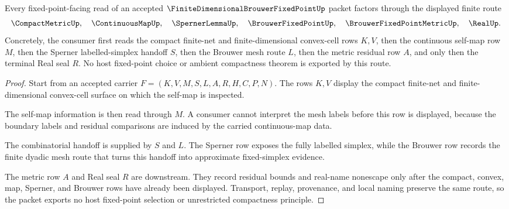 \begin{theorem}
\label{thm:finite-dimensional-brouwer-fixed-point-sperner-mesh-route}
Every fixed-point-facing read of an accepted $\FiniteDimensionalBrouwerFixedPointUp$ packet factors through the displayed finite route
$$
\CompactMetricUp,\quad \ContinuousMapUp,\quad \SpernerLemmaUp,\quad \BrouwerFixedPointUp,\quad \BrouwerFixedPointMetricUp,\quad \RealUp .
$$
Concretely, the consumer first reads the compact finite-net and finite-dimensional convex-cell rows $K,V$, then the continuous self-map row $M$, then the Sperner labelled-simplex handoff $S$, then the Brouwer mesh route $L$, then the metric residual row $A$, and only then the terminal Real seal $R$. No host fixed-point choice or ambient compactness theorem is exported by this route.
\end{theorem}
\begin{proof}
Start from an accepted carrier $F=(K,V,M,S,L,A,R,H,C,P,N)$. The rows $K,V$ display the compact finite-net and finite-dimensional convex-cell surface on which the self-map is inspected.

The self-map information is then read through $M$. A consumer cannot interpret the mesh labels before this row is displayed, because the boundary labels and residual comparisons are induced by the carried continuous-map data.

The combinatorial handoff is supplied by $S$ and $L$. The Sperner row exposes the fully labelled simplex, while the Brouwer row records the finite dyadic mesh route that turns this handoff into approximate fixed-simplex evidence.

The metric row $A$ and Real seal $R$ are downstream. They record residual bounds and real-name nonescape only after the compact, convex, map, Sperner, and Brouwer rows have already been displayed. Transport, replay, provenance, and local naming preserve the same route, so the packet exports no host fixed-point selection or unrestricted compactness principle.
\end{proof}


